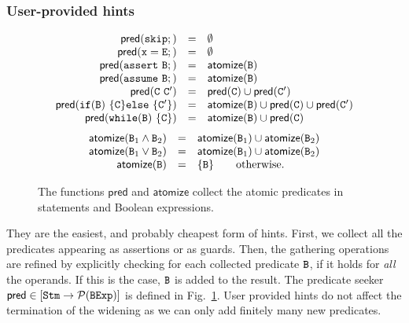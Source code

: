 \documentclass[sttt]{svjour}
\begin{document}
\subsubsection{User-provided hints}
\begin{figure}%

\small
{
\[
\begin{array}{rcl}
\mathsf{pred}(\mathtt{skip};) &=& \emptyset \\ 
\mathsf{pred}(\mathtt{x = E};) &=& \emptyset \\ 
\mathsf{pred}(\mathtt{assert}\ \mathtt{B};) &=& \mathsf{atomize}(\mathtt{B}) \\
\mathsf{pred}(\mathtt{assume}\ \mathtt{B};) &=& \mathsf{atomize}(\mathtt{B}) \\
\mathsf{pred}(\mathtt{C\ C'}) & = & \mathsf{pred}(\mathtt{C}) \cup \mathsf{pred}(\mathtt{C'}) \\
\mathsf{pred}(\mathtt{if}(\mathtt{B})~ \{ \mathtt{C} \} \mathtt{else}~\{ \mathtt{C'} \}) & = & \mathsf{atomize}(\mathtt{B}) \cup \mathsf{pred}(\mathtt{C}) \cup \mathsf{pred}(\mathtt{C'}) \\ 
\mathsf{pred}(\mathtt{while}(\mathtt{B})~\{\mathtt{C}\}) & = & \mathsf{atomize}(\mathtt{B}) \cup \mathsf{pred}(\mathtt{C}) 
\end{array}
\]
\[
\begin{array}{rcl}
\mathsf{atomize}(\mathtt{B}_1 \wedge\mathtt{B}_2)&=& \mathsf{atomize}(\mathtt{B}_1) \cup \mathsf{atomize}(\mathtt{B}_2) \\
\mathsf{atomize}(\mathtt{B}_1 \vee \mathtt{B}_2) &=& \mathsf{atomize}(\mathtt{B}_1) \cup \mathsf{atomize}(\mathtt{B}_2) \\
\mathsf{atomize}(\mathtt{B})  &=& \{ \mathtt{B} \}  \qquad \text{otherwise}.
\end{array}
\]
}

\caption{The functions $\mathsf{pred}$ and $\mathsf{atomize}$ collect the atomic predicates in statements and Boolean expressions.}
\label{fig:pred}
\end{figure}
They are the easiest, and probably cheapest form of hints.
First, we collect all the predicates appearing as assertions or as guards.
Then, the gathering operations are refined by explicitly checking for each collected predicate $\mathtt{B}$, if it holds for \emph{all} the operands.
If this is the case, $\mathtt{B}$ is  added to the result.
The predicate seeker $\mathsf{pred} \in [\mathtt{Stm} \rightarrow\mathcal{P}{(\mathtt{BExp})}]$ is defined in Fig.~\ref{fig:pred}.
User provided hints do not affect the termination of the widening as  we can only add finitely many new predicates.
\end{document}
